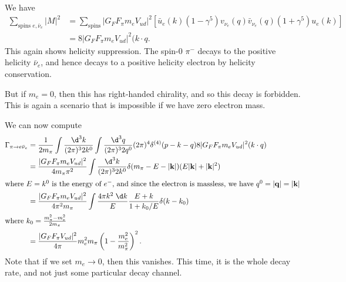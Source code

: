 \documentclass[a4paper]{article}
\begin{document}
We have
\begin{align*}
  \sum_{\text{spins }e, \bar{\nu}_e} |M|^2 &= \sum_{\mathrm{spins}} |G_F F_\pi m_e V_{ud}|^2 [\bar{u}_e(k) (1 - \gamma^5) v_{\nu_e}(q) \bar{v}_{\nu_e}(q) (1 + \gamma^5) u_e(k)]\\
  &= 8 |G_F F_\pi m_e V_{ud}|^2 (k \cdot q.
\end{align*}
This again shows helicity suppression. The spin-$0$ $\pi^-$ decays to the positive helicity $\bar{\nu}_e$, and hence decays to a positive helicity electron by helicity conservation.
\begin{center}
\end{center}
But if $m_e = 0$, then this has right-handed chirality, and so this decay is forbidden. This is again a scenario that is impossible if we have zero electron mass.

We can now compute
\begin{align*}
  \Gamma_{\pi \to e \bar{\nu}_e} &= \frac{1}{2 m_\pi} \int \frac{\d^3 k}{(2\pi)^3 2 k^0} \int \frac{\d^3 q}{(2\pi)^3 2 q^0} (2\pi)^4 \delta^{(4)}(p - k - q) 8 |G_F F_\pi m_e V_{ud}|^2 (k \cdot q)\\
  &= \frac{|G_F F_\pi m_e V_{ud}|^2 }{4 m_\pi \pi^2} \int \frac{\d^3 k}{(2\pi)^3 2 k^0} \delta(m_{\pi} - E - |\mathbf{k}|) (E |\mathbf{k}| + |\mathbf{k}|^2)\\
  \intertext{where $E = k^0$ is the energy of $e^-$, and since the electron is massless, we have $q^0 = |\mathbf{q}| = |\mathbf{k}|$}
  &= \frac{|G_F F_\pi m_e V_{ud}|^2}{4 \pi^2 m_\pi}\int \frac{4\pi k^2 \;\d k}{E} \frac{E + k}{1 + k_0/E} \delta(k - k_0)\\
  \intertext{where $k_0 = \frac{m_\pi^2 - m_e^2}{2 m_\pi}$}
  &= \frac{|G_F F_\pi V_{ud}|^2}{4\pi} m_e^2 m_\pi \left(1 - \frac{m_e^2}{m_\pi^2}\right)^2.
\end{align*}
Note that if we set $m_e \to 0$, then this vanishes. This time, it is the whole decay rate, and not just some particular decay channel.
\end{document}
